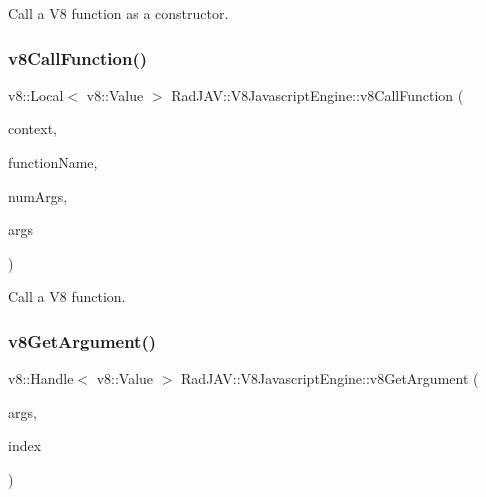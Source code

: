 Call a V8 function as a constructor. 

\mbox{\label{class_rad_j_a_v_1_1_v8_javascript_engine_ade8a5121713c49ba07afcfd38d8c7960}} 
\subsubsection{\texorpdfstring{v8\+Call\+Function()}{v8CallFunction()}}
{\footnotesize\ttfamily v8\+::\+Local$<$ v8\+::\+Value $>$ Rad\+J\+A\+V\+::\+V8\+Javascript\+Engine\+::v8\+Call\+Function (\begin{DoxyParamCaption}\item[{v8\+::\+Local$<$ v8\+::\+Object $>$}]{context,  }\item[{\mbox{\hyperlink{class_rad_j_a_v_1_1_string}{String}}}]{function\+Name,  }\item[{R\+J\+I\+NT}]{num\+Args,  }\item[{v8\+::\+Local$<$ v8\+::\+Value $>$ $\ast$}]{args }\end{DoxyParamCaption})}



Call a V8 function. 

\mbox{\label{class_rad_j_a_v_1_1_v8_javascript_engine_abbbd4c175913d3f27ee78d5a9a695571}} 
\subsubsection{\texorpdfstring{v8\+Get\+Argument()}{v8GetArgument()}}
{\footnotesize\ttfamily v8\+::\+Handle$<$ v8\+::\+Value $>$ Rad\+J\+A\+V\+::\+V8\+Javascript\+Engine\+::v8\+Get\+Argument (\begin{DoxyParamCaption}\item[{const v8\+::\+Function\+Callback\+Info$<$ v8\+::\+Value $>$ \&}]{args,  }\item[{R\+J\+U\+I\+NT}]{index }\end{DoxyParamCaption})}



